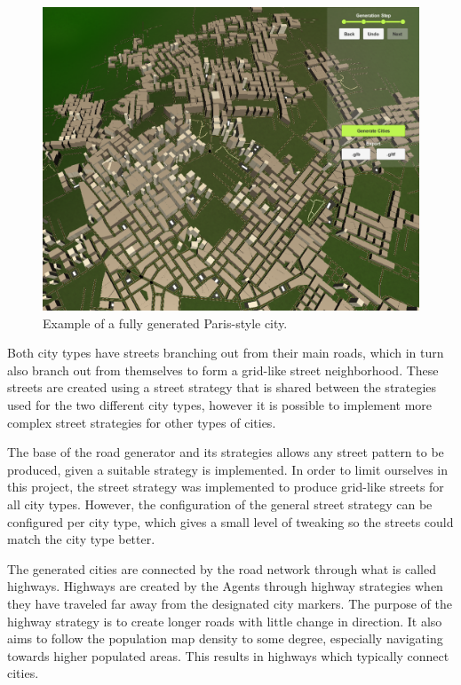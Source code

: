 \begin{figure}[H]
\begin{minipage}[b]{.49\textwidth}
\begin{minipage}[b]{.9\textwidth}
      \includegraphics[width=\textwidth]{figure/results/city_paris.png}
      \caption{Example of a fully generated Paris-style city.}
      \label{fig:results_city_paris}
    \end{minipage}
  \end{minipage}
\end{figure}

Both city types have streets branching out from their main roads, which in turn also branch out from themselves to form a grid-like street neighborhood.
These streets are created using a street strategy that is shared between the strategies used for the two different city types, however it is possible to implement more complex street strategies for other types of cities.

The base of the road generator and its strategies allows any street pattern to be produced, given a suitable strategy is implemented.
In order to limit ourselves in this project, the street strategy was implemented to produce grid-like streets for all city types.
However, the configuration of the general street strategy can be configured per city type, which gives a small level of tweaking so the streets could match the city type better.

The generated cities are connected by the road network through what is called highways.
Highways are created by the Agents through highway strategies when they have traveled far away from the designated city markers.
The purpose of the highway strategy is to create longer roads with little change in direction.
It also aims to follow the population map density to some degree, especially navigating towards higher populated areas.
This results in highways which typically connect cities.
